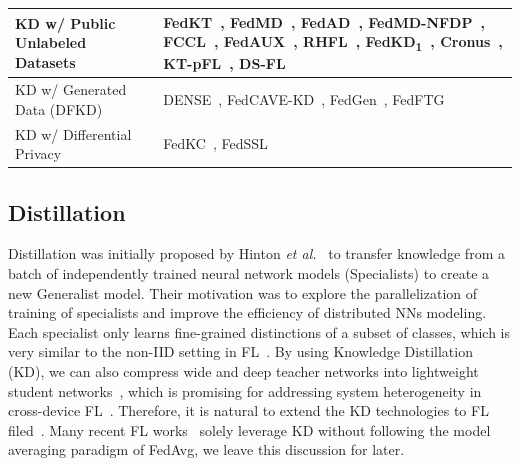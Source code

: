 \begin{table}[t]
\begin{tabular}{|ll|p{12cm}|}
    \multicolumn{2}{|l|}{KD w/ Public Unlabeled Datasets} & FedKT~\cite{li2021practical}, FedMD~\cite{li2019fedmd}, FedAD~\cite{gong2021ensemble}, FedMD-NFDP~\cite{sun2020federated}, FCCL~\cite{huang2022learn}, FedAUX~\cite{sattler2021fedaux}, RHFL~\cite{fang2022robust}, FedKD\textsubscript{1}~\cite{gong2022preserving}, Cronus~\cite{chang2021cronus}, KT-pFL~\cite{zhang2021parameterized}, DS-FL~\cite{itahara2021distillation} \\ \hline
    \multicolumn{2}{|l|}{KD w/ Generated Data (DFKD)} & DENSE~\cite{zhang2022dense}, FedCAVE-KD~\cite{heinbaugh2023data}, FedGen~\cite{zhu2021data},
    FedFTG~\cite{zhang2022fine} \\ \hline 
    \multicolumn{2}{|l|}{KD w/ Differential Privacy} & FedKC~\cite{wang2022fedkc}, FedSSL~\cite{fan2022private}  \\ \hline
    \end{tabular}
\end{table}

\subsection{Distillation}
\label{sec:distillation}
Distillation was initially proposed by Hinton \textit{et al.}~\cite{hinton2015distilling} to transfer knowledge from a batch of independently trained neural network models (Specialists) to create a new Generalist model.
Their motivation was to explore the parallelization of training of specialists and improve the efficiency of distributed NNs modeling\cite{dean2012large}.
Each specialist only learns fine-grained distinctions of a subset of classes, which is very similar to the non-IID setting in FL~\cite{liqb2022federated}.
By using Knowledge Distillation (KD), we can also compress wide and deep teacher networks into lightweight student networks~\cite{romero2015fitnets}, which is promising for addressing system heterogeneity in cross-device FL~\cite{lim2020federated}.
Therefore, it is natural to extend the KD technologies to FL filed~\cite{wu2022communication}.
Many recent FL works~\cite{aketi2024cross, luo2022fediris, tan2022fedproto}
solely leverage KD without following the model averaging paradigm of FedAvg, we leave this discussion for later. %

